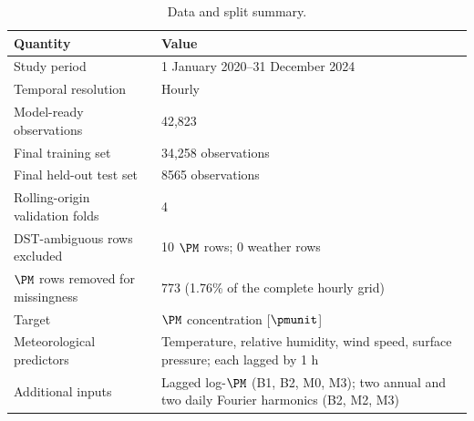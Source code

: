 \begin{table}[H]
\caption{Data and split summary.\label{tab:data-summary}}
\centering
\small
\begin{tabularx}{\textwidth}{p{}X}
\toprule
\textbf{Quantity} & \textbf{Value}\\
\midrule
Study period & 1 January 2020--31 December 2024\\
Temporal resolution & Hourly\\
Model-ready observations & 42,823\\
Final training set & 34,258 observations\\
Final held-out test set & 8565 observations\\
Rolling-origin validation folds & 4\\
DST-ambiguous rows excluded & 10 $\PM$ rows; 0 weather rows\\
$\PM$ rows removed for missingness & 773 (1.76\% of the complete hourly grid)\\
Target & $\PM$ concentration [$\pmunit$]\\
Meteorological predictors & Temperature, relative humidity, wind speed, surface pressure; each lagged by 1 h\\
Additional inputs & Lagged log-$\PM$ (B1, B2, M0, M3); two annual and two daily Fourier harmonics (B2, M2, M3)\\
\bottomrule
\end{tabularx}
\end{table}

